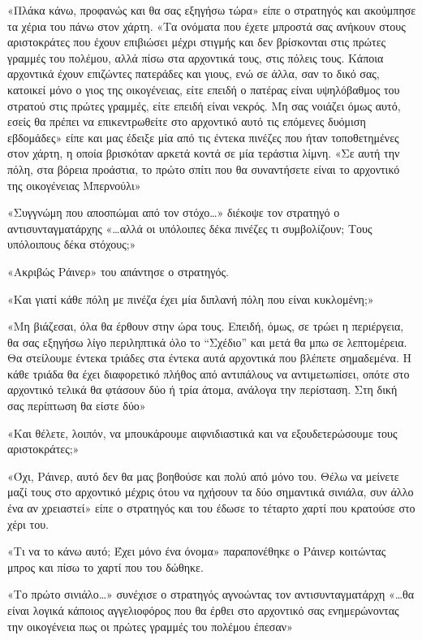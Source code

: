 \documentclass[12pt,twoside, openany]{book}
\begin{document}
«Πλάκα κάνω, προφανώς και θα σας εξηγήσω τώρα» είπε ο στρατηγός και ακούμπησε τα χέρια του πάνω στον χάρτη. «Τα ονόματα που έχετε μπροστά σας ανήκουν στους αριστοκράτες που έχουν επιβιώσει μέχρι στιγμής και δεν βρίσκονται στις πρώτες γραμμές του πολέμου, αλλά πίσω στα αρχοντικά τους, στις πόλεις τους. Κάποια αρχοντικά έχουν επιζώντες πατεράδες και γιους, ενώ σε άλλα, σαν το δικό σας, κατοικεί μόνο ο γιος της οικογένειας, είτε επειδή ο πατέρας είναι υψηλόβαθμος του στρατού στις πρώτες γραμμές, είτε επειδή είναι νεκρός. Μη σας νοιάζει όμως αυτό, εσείς θα πρέπει να επικεντρωθείτε στο αρχοντικό αυτό τις επόμενες δυόμιση εβδομάδες» είπε και μας έδειξε μία από τις έντεκα πινέζες που ήταν τοποθετημένες στον χάρτη, η οποία βρισκόταν αρκετά κοντά σε μία τεράστια λίμνη. «Σε αυτή την πόλη, στα βόρεια προάστια, το πρώτο σπίτι που θα συναντήσετε είναι το αρχοντικό της οικογένειας Μπερνούλι»

«Συγγνώμη που αποσπώμαι από τον στόχο…» διέκοψε τον στρατηγό ο αντισυνταγματάρχης «…αλλά οι υπόλοιπες δέκα πινέζες τι συμβολίζουν; Τους υπόλοιπους δέκα στόχους;»

«Ακριβώς Ράινερ» του απάντησε ο στρατηγός.

«Και γιατί κάθε πόλη με πινέζα έχει μία διπλανή πόλη που είναι κυκλομένη;»

«Μη βιάζεσαι, όλα θα έρθουν στην ώρα τους. Επειδή, όμως, σε τρώει η περιέργεια, θα σας εξηγήσω λίγο περιληπτικά όλο το “Σχέδιο” και μετά θα μπω σε λεπτομέρεια. Θα στείλουμε έντεκα τριάδες στα έντεκα αυτά αρχοντικά που βλέπετε σημαδεμένα. Η κάθε τριάδα θα έχει διαφορετικό πλήθος από αντιπάλους να αντιμετωπίσει, οπότε στο αρχοντικό τελικά θα φτάσουν δύο ή τρία άτομα, ανάλογα την περίσταση. Στη δική σας περίπτωση θα είστε δύο»

«Και θέλετε, λοιπόν, να μπουκάρουμε αιφνιδιαστικά και να εξουδετερώσουμε τους αριστοκράτες;»

«Όχι, Ράινερ, αυτό δεν θα μας βοηθούσε και πολύ από μόνο του. Θέλω να μείνετε μαζί τους στο αρχοντικό μέχρις ότου να ηχήσουν τα δύο σημαντικά σινιάλα, συν άλλο ένα αν χρειαστεί» είπε ο στρατηγός και του έδωσε το τέταρτο χαρτί που κρατούσε στο χέρι του.

«Τι να το κάνω αυτό; Έχει μόνο ένα όνομα» παραπονέθηκε ο Ράινερ κοιτώντας μπρος και πίσω το χαρτί που του δώθηκε.

«Το πρώτο σινιάλο…» συνέχισε ο στρατηγός αγνοώντας τον αντισυνταγματάρχη «…θα είναι λογικά κάποιος αγγελιοφόρος που θα έρθει στο αρχοντικό σας ενημερώνοντας την οικογένεια πως οι πρώτες γραμμές του πολέμου έπεσαν»
\end{document}
